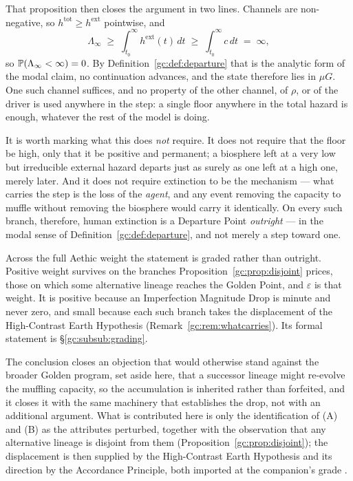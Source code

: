 \begin{example}
That proposition then closes the argument in two lines. Channels are
non-negative, so $h^{\mathrm{tot}}\ge h^{\mathrm{ext}}$ pointwise, and
\[
\Lambda_\infty\;\ge\;\int_{t_0}^{\infty}h^{\mathrm{ext}}(t)\,dt
\;\ge\;\int_{t_0}^{\infty}c\,dt\;=\;\infty ,
\]
so $\mathbb{P}(\Lambda_\infty<\infty)=0$. By
Definition~\ref{gc:def:departure} that is the analytic form of the
modal claim, no continuation advances, and the state therefore
lies in $\mu G$. One such channel suffices, and no property of the
other channel, of $\rho$, or of the driver is used anywhere in the
step: a single floor anywhere in the total hazard is enough, whatever
the rest of the model is doing.

It is worth marking what this does \emph{not} require. It does not
require that the floor be high, only that it be positive and permanent;
a biosphere left at a very low but irreducible external hazard departs
just as surely as one left at a high one, merely later. And it does not
require extinction to be the mechanism --- what carries the step is the
loss of the \emph{agent}, and any event removing the capacity to muffle
without removing the biosphere would carry it identically.
On every such branch, therefore, human extinction is a Departure Point
\emph{outright} --- in the modal sense of
Definition~\ref{gc:def:departure}, and not merely a step toward one.

Across the full Aethic weight the statement is graded rather than
outright. Positive weight survives on the branches
Proposition~\ref{gc:prop:disjoint} prices, those on which some
alternative lineage reaches the Golden Point, and $\varepsilon$ is
that weight. It is positive because an Imperfection Magnitude Drop is
minute and never zero, and small because each such branch takes the
displacement of the High-Contrast Earth Hypothesis
(Remark~\ref{gc:rem:whatcarries}). Its formal statement is
\S\ref{gc:subsub:grading}.

\begin{remark}
\label{gc:rem:whatcarries}
The conclusion closes an objection that would otherwise stand against
the broader Golden program, set aside here, that a successor lineage might re-evolve the muffling
capacity, so the accumulation is inherited rather than forfeited, and
it closes it with the same machinery that establishes the drop, not
with an additional argument. What is contributed here is only the
identification of (A) and (B) as the attributes perturbed, together
with the observation that any alternative lineage is disjoint from them
(Proposition~\ref{gc:prop:disjoint}); the displacement is then supplied
by the High-Contrast Earth Hypothesis and its direction by the
Accordance Principle, both imported at the companion's grade
\cite{Nexus,AethusOptimalEarth}.


\end{remark}
\end{example}
